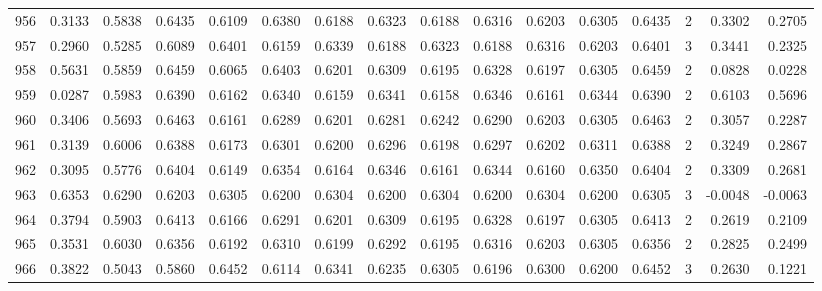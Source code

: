 \begin{tabular}{lrrrrrrrrrrrrrrr}
956 &      0.3133 &  0.5838 &  0.6435 &  0.6109 &  0.6380 &  0.6188 &  0.6323 &  0.6188 &  0.6316 &  0.6203 &   0.6305 &     0.6435 &      2 &                    0.3302 &                     0.2705 \\
957 &      0.2960 &  0.5285 &  0.6089 &  0.6401 &  0.6159 &  0.6339 &  0.6188 &  0.6323 &  0.6188 &  0.6316 &   0.6203 &     0.6401 &      3 &                    0.3441 &                     0.2325 \\
958 &      0.5631 &  0.5859 &  0.6459 &  0.6065 &  0.6403 &  0.6201 &  0.6309 &  0.6195 &  0.6328 &  0.6197 &   0.6305 &     0.6459 &      2 &                    0.0828 &                     0.0228 \\
959 &      0.0287 &  0.5983 &  0.6390 &  0.6162 &  0.6340 &  0.6159 &  0.6341 &  0.6158 &  0.6346 &  0.6161 &   0.6344 &     0.6390 &      2 &                    0.6103 &                     0.5696 \\
960 &      0.3406 &  0.5693 &  0.6463 &  0.6161 &  0.6289 &  0.6201 &  0.6281 &  0.6242 &  0.6290 &  0.6203 &   0.6305 &     0.6463 &      2 &                    0.3057 &                     0.2287 \\
961 &      0.3139 &  0.6006 &  0.6388 &  0.6173 &  0.6301 &  0.6200 &  0.6296 &  0.6198 &  0.6297 &  0.6202 &   0.6311 &     0.6388 &      2 &                    0.3249 &                     0.2867 \\
962 &      0.3095 &  0.5776 &  0.6404 &  0.6149 &  0.6354 &  0.6164 &  0.6346 &  0.6161 &  0.6344 &  0.6160 &   0.6350 &     0.6404 &      2 &                    0.3309 &                     0.2681 \\
963 &      0.6353 &  0.6290 &  0.6203 &  0.6305 &  0.6200 &  0.6304 &  0.6200 &  0.6304 &  0.6200 &  0.6304 &   0.6200 &     0.6305 &      3 &                   -0.0048 &                    -0.0063 \\
964 &      0.3794 &  0.5903 &  0.6413 &  0.6166 &  0.6291 &  0.6201 &  0.6309 &  0.6195 &  0.6328 &  0.6197 &   0.6305 &     0.6413 &      2 &                    0.2619 &                     0.2109 \\
965 &      0.3531 &  0.6030 &  0.6356 &  0.6192 &  0.6310 &  0.6199 &  0.6292 &  0.6195 &  0.6316 &  0.6203 &   0.6305 &     0.6356 &      2 &                    0.2825 &                     0.2499 \\
966 &      0.3822 &  0.5043 &  0.5860 &  0.6452 &  0.6114 &  0.6341 &  0.6235 &  0.6305 &  0.6196 &  0.6300 &   0.6200 &     0.6452 &      3 &                    0.2630 &                     0.1221 \\

\end{tabular}
